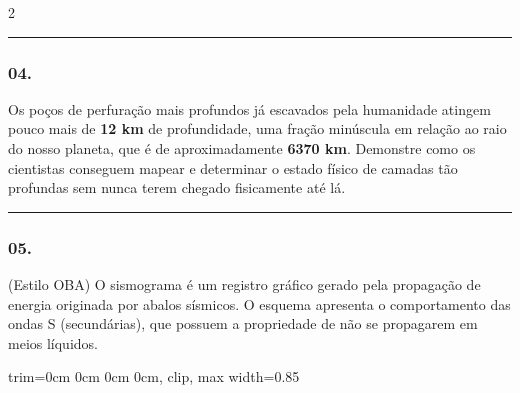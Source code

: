 \documentclass[twoside, 10pt, a4paper]{article}
\newlength{\espacoPreQuestao}
\newlength{\espacoQuestao}
\newcommand{\larguraTikz}{0.85\linewidth} %
\begin{document}
\begin{multicols*}{2}
\noindent\textcolor{CorLinha}{\rule{\linewidth}{0.5pt}} 
\par\vspace{\espacoPreQuestao}
\subsubsection*{04.} Os poços de perfuração mais profundos já escavados pela humanidade atingem pouco mais de \textbf{12 km} de profundidade, uma fração minúscula em relação ao raio do nosso planeta, que é de aproximadamente \textbf{6370 km}. Demonstre como os cientistas conseguem mapear e determinar o estado físico de camadas tão profundas sem nunca terem chegado fisicamente até lá.
\par\vspace{\espacoQuestao}

\noindent\textcolor{CorLinha}{\rule{\linewidth}{0.5pt}} 
\par\vspace{\espacoPreQuestao}
\subsubsection*{05.} (Estilo OBA) O sismograma é um registro gráfico gerado pela propagação de energia originada por abalos sísmicos. O esquema apresenta o comportamento das ondas S (secundárias), que possuem a propriedade de não se propagarem em meios líquidos.

\begin{center}
\begin{adjustbox}{trim=0cm 0cm 0cm 0cm, clip, max width=\larguraTikz}
\end{adjustbox}
\end{center}
\end{multicols*}
\end{document}
